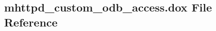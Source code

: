 \subsection{mhttpd\_\-custom\_\-odb\_\-access.dox File Reference}
\label{mhttpd__custom__odb__access_8dox}
